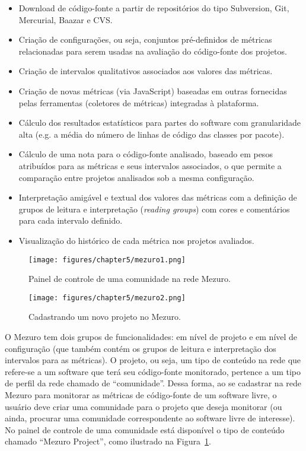 \begin{itemize}

\item Download de código-fonte a partir de repositórios do tipo
Subversion, Git, Mercurial, Baazar e CVS.
%
\item Criação de configurações, ou seja, conjuntos pré-definidos de
métricas relacionadas para serem usadas na avaliação do código-fonte dos
projetos.
%
\item Criação de intervalos qualitativos associados aos valores das métricas.
%
\item Criação de novas métricas (via JavaScript) baseadas em outras
fornecidas pelas ferramentas (coletores de métricas) integradas à plataforma.
%
\item Cálculo dos resultados estatísticos para partes do software com
granularidade alta (e.g. a média do número de linhas de código das classes
por pacote).
%
\item Cálculo de uma nota para o código-fonte analisado, baseado em pesos
atribuídos para as métricas e seus intervalos associados, o que permite a
comparação entre projetos analisados sob a mesma configuração.
%
\item Interpretação amigável e textual dos valores das métricas com a
definição de grupos de leitura e interpretação (\textit{reading groups}) com
cores e comentários para cada intervalo definido.

\item Visualização do histórico de cada métrica nos projetos avaliados.

\end{itemize}

\begin{figure}[!h]
\centering
\texttt{[image: figures/chapter5/mezuro1.png]}
\caption{Painel de controle de uma comunidade na rede Mezuro.}
\label{mezuro1}
\end{figure}

\begin{figure}[!h]
\centering
\texttt{[image: figures/chapter5/mezuro2.png]}
\caption{Cadastrando um novo projeto no Mezuro.}
\label{mezuro2}
\end{figure}

O Mezuro tem dois grupos de funcionalidades: em nível de projeto e em nível de configuração
(que também contém os grupos de leitura e interpretação dos intervalos para as
métricas).
%
O projeto, ou seja, um tipo de conteúdo na rede que refere-se a um software que
terá seu código-fonte monitorado, pertence a um tipo de perfil da rede chamado
de ``comunidade''.
%
Dessa forma, ao se cadastrar na rede Mezuro para monitorar as métricas de
código-fonte de um software livre, o usuário deve criar uma comunidade
para o projeto que deseja monitorar (ou ainda, procurar uma comunidade
correspondente ao software livre de interesse).
%
No painel de controle de uma comunidade está disponível o tipo de conteúdo
chamado ``Mezuro Project'', como ilustrado na Figura~\ref{mezuro1}.

